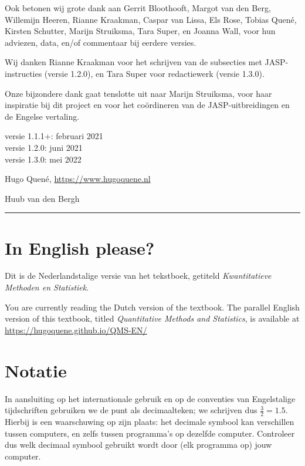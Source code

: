 \documentclass[
]{book}
\begin{document}
Ook betonen wij grote dank aan
Gerrit Bloothooft,
Margot van den Berg,
Willemijn Heeren,
Rianne Kraakman,
Caspar van Lissa,
Els Rose,
Tobias Quené,
Kirsten Schutter,
Marijn Struiksma,
Tara Super,
en Joanna Wall,
voor hun adviezen, data, en/of commentaar bij eerdere versies.

Wij danken Rianne Kraakman voor het schrijven van de subsecties met JASP-instructies (versie 1.2.0), en Tara Super voor redactiewerk (versie 1.3.0).

Onze bijzondere dank gaat tenslotte uit naar Marijn Struiksma, voor haar inspiratie bij dit project en voor het coördineren van de JASP-uitbreidingen en de Engelse vertaling.

versie 1.1.1+: februari 2021\\
versie 1.2.0: juni 2021\\
versie 1.3.0: mei 2022

Hugo Quené, \url{https://www.hugoquene.nl}

Huub van den Bergh

\begin{center}\rule{0.5\linewidth}{0.5pt}\end{center}

\section*{In English please?}\label{in-english-please}

Dit is de Nederlandstalige versie van het tekstboek, getiteld \emph{Kwantitatieve Methoden en Statistiek}.

You are currently reading the Dutch version of the textbook.
The parallel English version of this textbook, titled \emph{Quantitative Methods and Statistics}, is available at \url{https://hugoquene.github.io/QMS-EN/}

\section*{Notatie}\label{notatie}

In aansluiting op het internationale gebruik en op de conventies van Engelstalige tijdschriften gebruiken we de punt als decimaalteken; we schrijven dus \(\frac{3}{2}=1.5\). Hierbij is een waarschuwing op zijn plaats: het decimale symbool kan verschillen tussen computers, en zelfs tussen programma's op dezelfde computer. Controleer dus welk decimaal symbool gebruikt wordt door (elk programma op) jouw computer.
\end{document}
